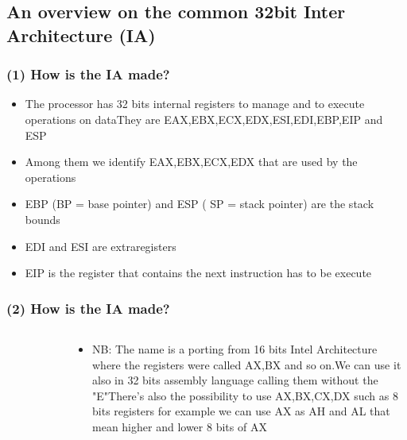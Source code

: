 \documentclass[]{beamer}
\begin{document}
	\subsection{An overview on the common 32bit Inter Architecture (IA)}
		\begin{frame}
			\frametitle{(1) How is the IA made?}
			\begin{itemize}
				\item{The processor has 32 bits internal registers to manage and to execute operations on data\newline They are EAX,EBX,ECX,EDX,ESI,EDI,EBP,EIP and ESP }
				\item{Among them we identify EAX,EBX,ECX,EDX that are used by the operations}
				\item{EBP (BP = base pointer) and ESP ( SP = stack pointer) are the stack bounds }
				\item{EDI and ESI are extraregisters}
				\item{EIP is the register that contains the next instruction has to be execute}
			\end{itemize}
		\end{frame}
		\begin{frame}
			\frametitle{(2) How is the IA made?}
			\begin{columns}
				\begin{column}[left]{2.5in}
					\begin{figure}
						\includegraphics[height=1.6in]{images/registers.jpeg}
						\label{Registers Division}
					\end{figure}
				\end{column}
				\begin{column}[right]{2.5in}
					\begin{itemize}
						\item{NB: The name is a porting from 16 bits Intel Architecture where the registers were called AX,BX and so on.\newline We can use it also in 32 bits assembly language calling them without the "E"\newline There's also the possibility to use AX,BX,CX,DX such as 8 bits registers for example we can use AX as AH and AL that mean higher and lower 8 bits of AX}
					\end{itemize}
				\end{column}
			\end{columns}
		\end{frame}
\end{document}
